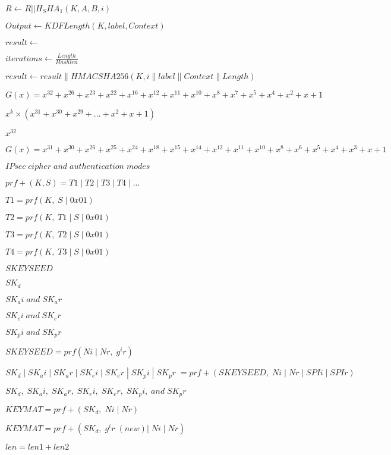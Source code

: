 \documentclass{article}
\begin{document}
$ R \leftarrow R || H_SHA_1(K, A, B, i) $
\pagebreak

$ Output \leftarrow KDFLength (K, label, Context) $
\pagebreak

$ result \leftarrow $
\pagebreak

$ iterations \leftarrow \frac {Length}{Hashlen} $
\pagebreak

$ result \leftarrow result \parallel HMACSHA256(K, i \parallel label \parallel Context \parallel Length) $
\pagebreak

\[ G(x) = {x}^{32} + {x}^{26} + {x}^{23} + {x}^{22} + {x}^{16} + {x}^{12} + {x}^{11} + {x}^{10} + x^8 + x^7 + x^5 + x^4 + x^2 + x + 1 \]
\pagebreak

$x^k × ({x}^{31} + {x}^{30} + {x}^{29} +...+ x^2 + x + 1)$
\pagebreak

${x}^{32}$
\pagebreak

\[ G(x) = {x}^{31} + {x}^{30} + {x}^{26} + {x}^{25} + {x}^{24} + {x}^{18} + {x}^{15} + {x}^{14} + {x}^{12} + {x}^{11} + {x}^{10} + x^8 + x^6 + x^5 + x^4 + x^3 + x + 1 \]
\pagebreak

$ IPsec\; cipher\; and\; authentication\; modes $
\pagebreak

$ prf+ (K,S) = T1\;|\;T2\;|\;T3\;|\;T4\;|\;...$
\pagebreak

$ T1 = prf (K,\;S\;|\;0x01)$
\pagebreak

$ T2 = prf (K,\;T1\;|\;S\;|\;0x01)$
\pagebreak

$ T3 = prf (K,\;T2\;|\;S\;|\;0x01)$
\pagebreak

$ T4 = prf (K,\;T3\;|\;S\;|\;0x01)$
\pagebreak

$ SKEYSEED$
\pagebreak

$ SK_d$
\pagebreak

$SK_ai \; and \; SK_ar$
\pagebreak

$ SK_ei \; and \; SK_er$
\pagebreak

$ SK_pi \; and \; SK_pr$
\pagebreak

$ SKEYSEED = prf(Ni\;|\;Nr,\;g^ir)$
\pagebreak

$ {SK_d\;|\;SK_ai\;|\;SK_ar\;|\;SK_ei\;|\;SK_er\;|\;SK_pi\;|\;SK_pr\;} = prf+ (SKEYSEED,\;Ni\;|\;Nr\;|\;SPIi\;|\;SPIr)$
\pagebreak

$ SK_d,\;SK_ai,\;SK_ar,\;SK_ei,\;SK_er,\;SK_pi,\;and\;SK_pr$
\pagebreak

$ KEYMAT = prf+(SK_d,\;Ni\;|\;Nr) $
\pagebreak

$ KEYMAT = prf+(SK_d,\;g^ir\;(new) |\;Ni\;|\;Nr) $
\pagebreak

$ len = len1 + len2 $
\pagebreak
\end{document}
